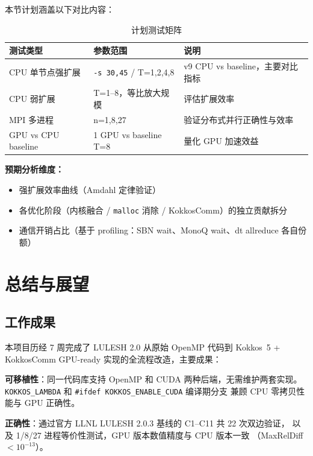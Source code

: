 \documentclass[UTF8,12pt,a4paper]{ctexart}
\begin{document}
\bigskip
本节计划涵盖以下对比内容：

\begin{table}[H]
\centering
\caption{计划测试矩阵}
\label{tab:planned}
\begin{tabular}{lll}
\toprule
\textbf{测试类型} & \textbf{参数范围} & \textbf{说明} \\
\midrule
CPU 单节点强扩展 & \texttt{-s 30,45} / T=1,2,4,8 & v9 CPU vs baseline，主要对比指标 \\
CPU 弱扩展       & T=1--8，等比放大规模           & 评估扩展效率 \\
MPI 多进程       & n=1,8,27                       & 验证分布式并行正确性与效率 \\
GPU vs CPU baseline & 1 GPU vs baseline T=8       & 量化 GPU 加速效益 \\
\bottomrule
\end{tabular}
\end{table}

\textbf{预期分析维度：}
\begin{itemize}[noitemsep,topsep=2pt]
  \item 强扩展效率曲线（Amdahl 定律验证）
  \item 各优化阶段（内核融合 / \texttt{malloc} 消除 / KokkosComm）的独立贡献拆分
  \item 通信开销占比（基于 profiling：SBN wait、MonoQ wait、dt allreduce 各自份额）
\end{itemize}

\section{总结与展望}

\subsection{工作成果}

本项目历经 7 周完成了 LULESH 2.0 从原始 OpenMP 代码到
Kokkos~5 + KokkosComm GPU-ready 实现的全流程改造，主要成果：

\textbf{可移植性}：同一代码库支持 OpenMP 和 CUDA 两种后端，无需维护两套实现。
\texttt{KOKKOS\_LAMBDA} 和 \texttt{\#ifdef KOKKOS\_ENABLE\_CUDA} 编译期分支
兼顾 CPU 零拷贝性能与 GPU 正确性。

\textbf{正确性}：通过官方 LLNL LULESH 2.0.3 基线的 C1--C11 共 22 次双边验证，
以及 1/8/27 进程等价性测试，GPU 版本数值精度与 CPU 版本一致
（MaxRelDiff $< 10^{-13}$）。
\end{document}

